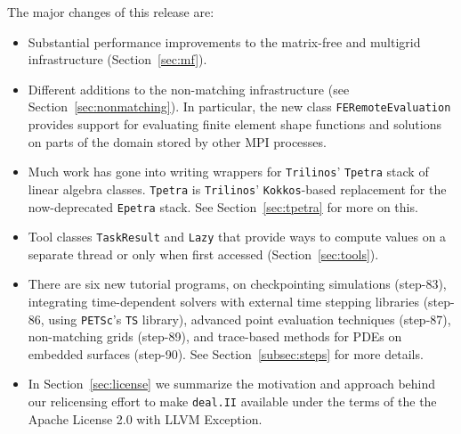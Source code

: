 \documentclass{ansarticle-preprint}
\newcommand{\specialword}[1]{\texttt{#1}}
\newcommand{\dealii}{{\specialword{deal.II}}\xspace}
\newcommand{\trilinos}{{\specialword{Trilinos}}\xspace}
\newcommand{\petsc}{\specialword{PETSc}\xspace}
\newcommand{\ts}{{\specialword{TS}}\xspace}
\newcommand{\kokkos}{{\specialword{Kokkos}}\xspace}
\newcommand{\epetra}{{\specialword{Epetra}}\xspace}
\newcommand{\tpetra}{{\specialword{Tpetra}}\xspace}
\begin{document}
The major changes of this release are:
%
\begin{itemize}
  \item
    Substantial performance improvements to the matrix-free and multigrid
    infrastructure (Section~\ref{sec:mf}).
  \item
    Different additions to the non-matching infrastructure (see
    Section~\ref{sec:nonmatching}). In particular, the new class
    \texttt{FERemoteEvaluation} provides support for evaluating finite
    element shape functions and solutions on parts of the domain stored by
    other MPI processes.
  \item
    Much work has gone into writing wrappers for \trilinos' \tpetra{} stack
    of linear algebra classes. \tpetra{} is \trilinos' \kokkos-based
    replacement for the now-deprecated \epetra{} stack. See
    Section~\ref{sec:tpetra} for more on this.
  \item
    Tool classes \texttt{TaskResult} and \texttt{Lazy} that provide ways to
    compute values on a separate thread or only when first accessed
    (Section~\ref{sec:tools}).
  \item
    There are six new tutorial programs, on checkpointing simulations
    (step-83), integrating time-dependent solvers with external time
    stepping libraries (step-86, using \petsc's \ts{} library), advanced
    point evaluation techniques (step-87), non-matching grids (step-89),
    and trace-based methods for PDEs on embedded surfaces (step-90). See
    Section~\ref{subsec:steps} for more details.
  \item
    In Section~\ref{sec:license} we summarize the motivation and approach
    behind our relicensing effort to make \dealii available under the terms
    of the the Apache License 2.0 with LLVM Exception.
\end{itemize}
%
\end{document}
